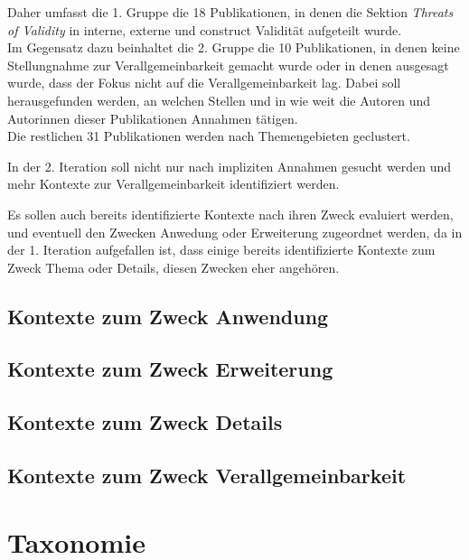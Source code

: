 Daher umfasst die 1. Gruppe die 18 Publikationen, in denen die Sektion \textit{Threats of Validity} in interne, externe und construct Validität aufgeteilt wurde. \\
Im Gegensatz dazu beinhaltet die 2. Gruppe die 10 Publikationen, in denen keine Stellungnahme zur Verallgemeinbarkeit gemacht wurde oder in denen ausgesagt wurde, dass der Fokus nicht auf die Verallgemeinbarkeit lag. Dabei soll herausgefunden werden, an welchen Stellen und in wie weit die Autoren und Autorinnen dieser Publikationen Annahmen tätigen. \\

Die restlichen 31 Publikationen werden nach Themengebieten geclustert.


In der 2. Iteration soll nicht nur nach impliziten Annahmen gesucht werden und mehr Kontexte zur Verallgemeinbarkeit identifiziert werden.

Es sollen auch bereits identifizierte Kontexte nach ihren Zweck evaluiert werden, und eventuell den Zwecken Anwedung oder Erweiterung zugeordnet werden,
da in der 1. Iteration aufgefallen ist, dass einige bereits identifizierte Kontexte zum Zweck Thema oder Details, diesen Zwecken eher angehören.



\subsection{Kontexte zum Zweck Anwendung}

\subsection{Kontexte zum Zweck Erweiterung}

\subsection{Kontexte zum Zweck Details}

\subsection{Kontexte zum Zweck Verallgemeinbarkeit}

\section{Taxonomie}

